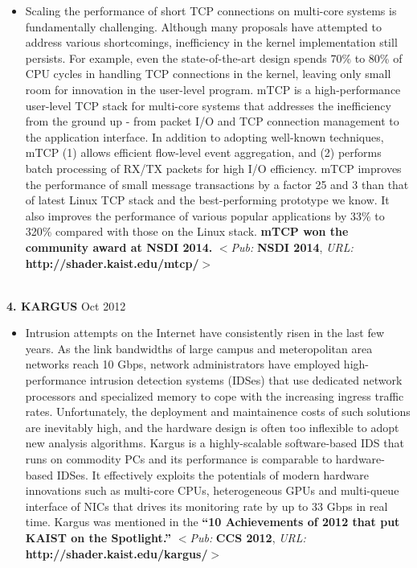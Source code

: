 \documentclass[10pt]{article}
\newenvironment{outerlist}[1][\enskip\textbullet]%
        {\begin{itemize}[#1]}{\end{itemize}%
         \vspace{-.6\baselineskip}}
\begin{document}
\begin{outerlist}
\item[] {Scaling the performance of short TCP connections on multi-core systems is fundamentally challenging. Although many proposals have attempted to address various shortcomings, inefficiency in the kernel implementation still persists. For example, even the state-of-the-art design spends 70\% to 80\% of CPU cycles in handling TCP connections in the kernel, leaving only small room for innovation in the user-level program. mTCP is a high-performance user-level TCP stack for multi-core systems that addresses the inefficiency from the ground up - from packet I/O and TCP connection management to the application interface. In addition to adopting well-known techniques, mTCP (1) allows efficient flow-level event aggregation, and (2) performs batch processing of RX/TX packets for high I/O efficiency. mTCP improves the performance of small message transactions by a factor 25 and 3 than that of latest Linux TCP stack and the best-performing prototype we know. It also improves the performance of various popular applications by 33\% to 320\% compared with those on the Linux stack. {\bf mTCP won the community award at NSDI 2014.} $<$\textit{Pub:} {\bf NSDI 2014}, \textit{URL:} {\bf http://shader.kaist.edu/mtcp/}$>$}
\end{outerlist}
\ \\
{\textbf{4. K{\footnotesize ARGUS}}}
        \hfill {Oct 2012}
\begin{outerlist}
\item[] {Intrusion attempts on the Internet have consistently risen in the last few years. As the link bandwidths of large campus and meteropolitan area networks reach 10 Gbps, network administrators have employed high-performance intrusion detection systems (IDSes) that use dedicated network processors and specialized memory to cope with the increasing ingress traffic rates. Unfortunately, the deployment and maintainence costs of such solutions are inevitably high, and the hardware design is often too inflexible to adopt new analysis algorithms. Kargus is a highly-scalable software-based IDS that runs on commodity PCs and its performance is comparable to hardware-based IDSes. It effectively exploits the potentials of modern hardware innovations such as multi-core CPUs, heterogeneous GPUs and multi-queue interface of NICs that drives its monitoring rate by up to 33 Gbps in real time. Kargus was mentioned in the {\bf ``10 Achievements of 2012 that put KAIST on the Spotlight.''} $<$\textit{Pub:} {\bf CCS 2012}, \textit{URL:} {\bf http://shader.kaist.edu/kargus/}$>$}
\end{outerlist}
\end{document}
